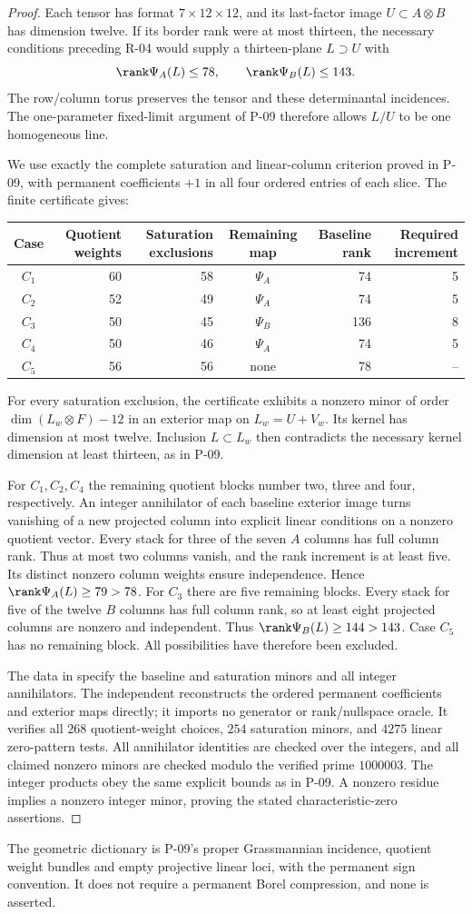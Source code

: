 \begin{proof}
Each tensor has format $7\times12\times12$, and its last-factor
image $U\subset A\otimes B$ has dimension twelve. If its border
rank were at most thirteen, the necessary conditions preceding
R-04 would supply a thirteen-plane $L\supset U$ with
\[
 \rank\Psi_A(L)\leq78,\qquad\rank\Psi_B(L)\leq143.
\]
The row/column torus preserves the tensor and these determinantal
incidences. The one-parameter fixed-limit argument of P-09 therefore
allows $L/U$ to be one homogeneous line.

We use exactly the complete saturation and linear-column criterion
proved in P-09, with permanent coefficients $+1$ in all four
ordered entries of each slice. The finite certificate gives:
\begin{center}
\begin{tabular}{c|r|r|c|r|r}
Case & Quotient weights & Saturation exclusions & Remaining map
 & Baseline rank & Required increment\\\hline
$C_1$ &60&58&$\Psi_A$&74&5\\
$C_2$ &52&49&$\Psi_A$&74&5\\
$C_3$ &50&45&$\Psi_B$&136&8\\
$C_4$ &50&46&$\Psi_A$&74&5\\
$C_5$ &56&56&none&78&--
\end{tabular}
\end{center}
For every saturation exclusion, the certificate exhibits a nonzero
minor of order $\dim(L_w\otimes F)-12$ in an exterior map on
$L_w=U+V_w$. Its kernel has dimension at most twelve. Inclusion
$L\subset L_w$ then contradicts the necessary kernel dimension
at least thirteen, as in P-09.

For $C_1,C_2,C_4$ the remaining quotient blocks number two,
three and four, respectively. An integer annihilator of each
baseline exterior image turns vanishing of a new projected
column into explicit linear conditions on a nonzero quotient
vector. Every stack for three of the seven $A$ columns has
full column rank. Thus at most two columns vanish, and the
rank increment is at least five. Its distinct nonzero column
weights ensure independence. Hence $\rank\Psi_A(L)\geq79>78$.
For $C_3$ there are five remaining blocks. Every stack for
five of the twelve $B$ columns has full column rank, so at
least eight projected columns are nonzero and independent.
Thus $\rank\Psi_B(L)\geq144>143$.
Case $C_5$ has no remaining block. All possibilities have
therefore been excluded.

The data in  specify the
baseline and saturation minors and all integer annihilators.
The independent 
reconstructs the ordered permanent coefficients and exterior
maps directly; it imports no generator or rank/nullspace oracle.
It verifies all $268$ quotient-weight choices, $254$ saturation
minors, and $4275$ linear zero-pattern tests. All annihilator
identities are checked over the integers, and all claimed
nonzero minors are checked modulo the verified prime $1000003$.
The integer products obey the same explicit bounds as in P-09.
A nonzero residue implies a nonzero integer minor, proving
the stated characteristic-zero assertions.
\end{proof}

The geometric dictionary is P-09's proper Grassmannian incidence,
quotient weight bundles and empty projective linear loci, with the
permanent sign convention. It does not require a permanent Borel
compression, and none is asserted.
